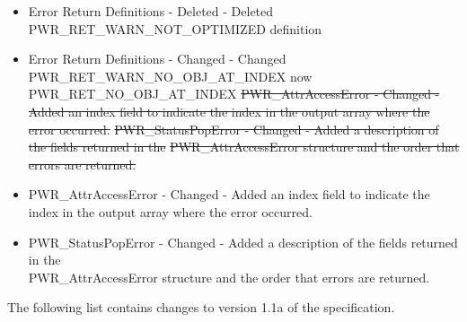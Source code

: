 \documentclass[12pt]{report} %
\providecommand{\DIFdeltex}[1]{{\protect\color{red}\sout{#1}}}                      %
\providecommand{\DIFaddbegin}{} %
\providecommand{\DIFaddend}{} %
\providecommand{\DIFdelbegin}{} %
\providecommand{\DIFdelend}{} %
\providecommand{\DIFdel}[1]{\texorpdfstring{\DIFdeltex{#1}}{}} %
\newcommand{\DIFscaledelfig}{0.5}
\newlength{\DIFdelgraphicswidth} %
\newlength{\DIFdelgraphicsheight} %
\newcommand{\DIFaddincludegraphics}[2][]{{\color{blue}\fbox{\DIFOincludegraphics[#1]{#2}}}} %
\newcommand{\DIFdelincludegraphics}[2][]{%
\sbox{\DIFdelgraphicsbox}{\DIFOincludegraphics[#1]{#2}}%
\settoboxwidth{\DIFdelgraphicswidth}{\DIFdelgraphicsbox} %
\settoboxtotalheight{\DIFdelgraphicsheight}{\DIFdelgraphicsbox} %
\scalebox{\DIFscaledelfig}{%
\parbox[b]{\DIFdelgraphicswidth}{\usebox{\DIFdelgraphicsbox}\\[-\baselineskip] \rule{\DIFdelgraphicswidth}{0em}}\llap{\resizebox{\DIFdelgraphicswidth}{\DIFdelgraphicsheight}{%
\setlength{\unitlength}{\DIFdelgraphicswidth}%
\begin{picture}(1,1)%
\thicklines\linethickness{2pt} %
{\color[rgb]{1,0,0}\put(0,0){\framebox(1,1){}}}%
{\color[rgb]{1,0,0}\put(0,0){\line( 1,1){1}}}%
{\color[rgb]{1,0,0}\put(0,1){\line(1,-1){1}}}%
\end{picture}%
}\hspace*{3pt}}} %
} %
\DeclareRobustCommand{\DIFaddbegin}{\DIFOaddbegin \let\includegraphics\DIFaddincludegraphics} %
\DeclareRobustCommand{\DIFaddend}{\DIFOaddend \let\includegraphics\DIFOincludegraphics} %
\DeclareRobustCommand{\DIFdelbegin}{\DIFOdelbegin \let\includegraphics\DIFdelincludegraphics} %
\DeclareRobustCommand{\DIFdelend}{\DIFOaddend \let\includegraphics\DIFOincludegraphics} %
\begin{document}
\begin{appendices}
\begin{itemize}
{    PWR_RET_WARN_NO_CHILDREN, PWR_RET_WARN_NO_PARENT definitions }
    \item{Error Return Definitions - Deleted - Deleted PWR_RET_WARN_NOT_OPTIMIZED definition }
    \item{Error Return Definitions - Changed - Changed PWR_RET_WARN_NO_OBJ_AT_INDEX now PWR_RET_NO_OBJ_AT_INDEX}
    \DIFdelbegin %
\DIFdel{PWR_AttrAccessError - Changed - Added an index field to indicate the index in the output array where the error occurred.
    }%
\DIFdel{PWR_StatusPopError - Changed - Added a description of the fields returned in the }%
\DIFdel{PWR_AttrAccessError structure and the order that errors are returned.
}\DIFdelend \DIFaddbegin \item{PWR_AttrAccessError - Changed - Added an index field to indicate the index in the output array where the error occurred.}
    \item{PWR_StatusPopError - Changed - Added a description of the fields returned in the \\
    PWR_AttrAccessError structure and the order that errors are returned.}
\DIFaddend \end{itemize}


The following list contains changes to version 1.1a of the specification.


\end{appendices}
\end{document}
